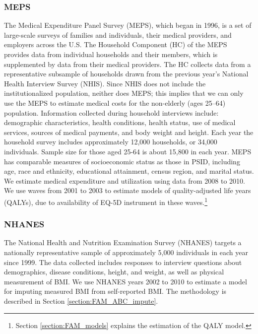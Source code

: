 \subsubsection{MEPS}
\noindent The Medical Expenditure Panel Survey (MEPS), which began in 1996, is a set of large-scale surveys of families and individuals, their medical providers, and employers across the U.S. The Household Component (HC) of the MEPS provides data from 
individual households and their members, which is supplemented by data from their medical providers. 
The HC collects data from a representative subsample of households drawn from the 
previous year's National Health Interview Survey (NHIS). Since NHIS does not include the 
institutionalized population, neither does MEPS; this implies that we can only use the MEPS to 
estimate medical costs for the non-elderly (ages 25--64) population. Information collected during household 
interviews include: demographic characteristics, health conditions, health status, use of medical 
services, sources of medical payments, and body weight and height. Each year the household survey 
includes approximately 12,000 households, or 34,000 individuals. Sample size for those aged 25-64 is 
about 15,800 in each year.  MEPS has comparable measures of socioeconomic status as those in PSID, 
including age, race and ethnicity, educational attainment, census region, and marital status.  We estimate medical expenditure 
and utilization using data from 2008 to 2010. We use waves from 2001 to 2003 to estimate models of quality-adjusted life years (QALYs), due to availability of EQ-5D instrument in these waves.\footnote{Section \ref{section:FAM_models} explains the estimation of the QALY model.} \\


\subsubsection{NHANES}
\noindent 
The National Health and Nutrition Examination Survey (NHANES) targets a nationally representative sample of approximately 5,000 individuals in each year since 1999.  The data collected includes responses to interview questions about demographics, disease conditions, height, and weight, as well as physical measurement of BMI.  We use NHANES years 2002 to 2010 to estimate a model for imputing measured BMI from self-reported BMI.  The methodology is described in Section \ref{section:FAM_ABC_impute}.


